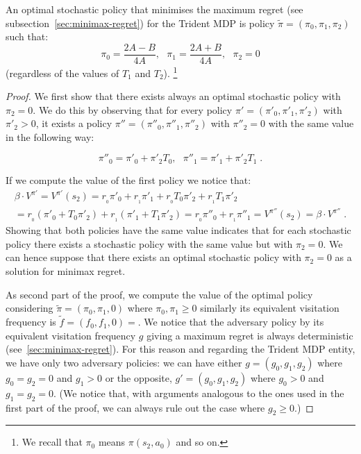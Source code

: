 \begin{proposition}\label{theorem:opt_stoc}
An optimal stochastic policy that minimises the maximum regret (see subsection~\ref{sec:minimax-regret}) for the Trident MDP is policy $\tilde{\pi} = (\pi_0, \pi_1, \pi_2)$ such that:
$$\pi_{0}=\dfrac{2A - B}{4A},~~~\pi_{1}=\dfrac{2A + B}{4A}, ~~~\pi_2 = 0$$
(regardless of the values of $T_1$ and $T_2$). \footnote{We recall that $\pi_0$ means $\pi(s_2, a_0)$ and so on.}
\end{proposition}
\begin{proof}
We first show that there exists always an optimal stochastic policy with $\pi_2 = 0$. We do this by observing that for every policy $\pi' = (\pi'_0, \pi'_1, \pi'_2)$ with $\pi'_2 > 0$, it exists a policy $\pi'' = (\pi''_0, \pi''_1, \pi''_2)$ with $\pi''_2 = 0$ with the same value in the following way:

$$\pi''_0 = \pi'_0 + \pi'_2 T_0, ~~~ \pi''_1 = \pi'_1 + \pi'_2 T_1\;.$$

If we compute the value of the first policy we notice that:
\begin{align*}
\beta \cdot V^{\pi'} = V^{\pi'}(s_2) =
r_{_0} \pi'_0 + r_{_1}\pi'_1 + r_{_0} T_0 \pi'_2 + r_{_1} T_1 \pi'_2 \\
= r_{_0} (\pi'_0 + T_0 \pi'_2) + r_{_1} (\pi'_1 + T_1 \pi'_2)
= r_{_0} \pi''_0 + r_{_1}\pi''_1 = V^{\pi''}(s_2) =\beta \cdot V^{\pi''}\;.
\end{align*}
Showing that both policies have the same value indicates that for each stochastic policy there exists a stochastic policy with the same value but with $\pi_2 = 0$. We can hence suppose that there exists an optimal stochastic policy with $\pi_2 =0$ as a solution for minimax regret. 

As second part of the proof, we compute the value of the optimal policy considering $\tilde{\pi} = (\pi_0, \pi_1, 0)$ where $\pi_0, \pi_1 \geq 0$ similarly its equivalent visitation frequency is $\tilde{f} = (f_0, f_1, 0) =$. 
We notice that the adversary policy by its equivalent visitation frequency $g$ giving a maximum regret is always deterministic (see~\ref{sec:minimax-regret}). For this reason and regarding the Trident MDP entity, we have only two adversary policies: we can have either $g = (g_0, g_1, g_2)$ where $g_0 = g_2=0$ and $g_1 > 0$ or the opposite, $g' = (g_0, g_1, g_2)$ where $g_0>0$ and $g_1 = g_2 = 0$. (We notice that, with arguments analogous to the ones used in the first part of the proof, we can always rule out the case where $g_2 \geq 0$.)


\end{proof}
